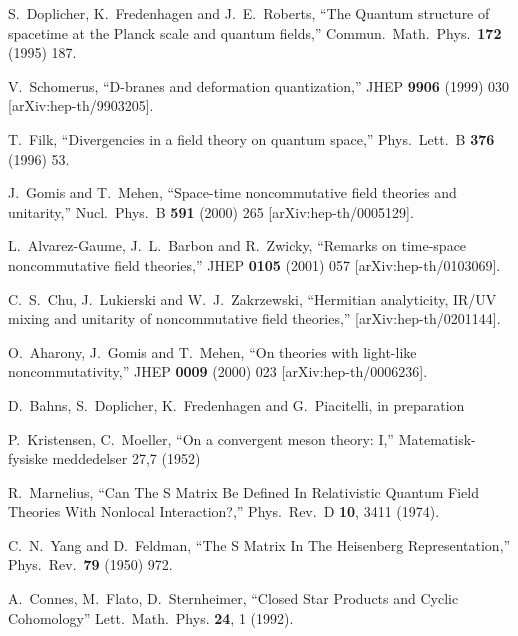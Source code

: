\documentclass[a4paper,twoside,12pt]{article}
\begin{document}
\begin{thebibliography}{99}

S.~Doplicher, K.~Fredenhagen and J.~E.~Roberts,
``The Quantum structure of spacetime at the Planck scale and quantum 
fields,''
Commun.\ Math.\ Phys.\  {\bf 172} (1995) 187.

V.~Schomerus,
``D-branes and deformation quantization,''
JHEP {\bf 9906} (1999) 030
[arXiv:hep-th/9903205].


T.~Filk,
``Divergencies in a field theory on quantum space,''
Phys.\ Lett.\ B {\bf 376} (1996) 53.


J.~Gomis and T.~Mehen,
``Space-time noncommutative field theories and unitarity,''
Nucl.\ Phys.\ B {\bf 591} (2000) 265
[arXiv:hep-th/0005129].


L.~Alvarez-Gaume, J.~L.~Barbon and R.~Zwicky,
``Remarks on time-space noncommutative field theories,''
JHEP {\bf 0105} (2001) 057
[arXiv:hep-th/0103069].

C.~S.~Chu, J.~Lukierski and W.~J.~Zakrzewski,
``Hermitian analyticity, IR/UV mixing and unitarity of noncommutative  field
theories,'' [arXiv:hep-th/0201144].

O.~Aharony, J.~Gomis and T.~Mehen,
``On theories with light-like noncommutativity,''
JHEP {\bf 0009} (2000) 023
[arXiv:hep-th/0006236].


D.~Bahns, S.~Doplicher, K.~Fredenhagen and G.~Piacitelli,
in preparation


P.~Kristensen, C.~Moeller,
``On a convergent meson theory: I,''
Matematisk-fysiske meddedelser 27,7 (1952)  


R.~Marnelius,
``Can The S Matrix Be Defined In Relativistic Quantum Field Theories With
Nonlocal Interaction?,'' 
Phys.\ Rev.\ D {\bf 10}, 3411 (1974).


C.~N.~Yang and D.~Feldman,
``The S Matrix In The Heisenberg Representation,''
Phys.\ Rev.\  {\bf 79} (1950) 972.


A.~Connes, M.~Flato, D.~Sternheimer,
``Closed Star Products and Cyclic Cohomology''
Lett.\ Math.\ Phys. {\bf 24}, 1 (1992).


\end{thebibliography}
\end{document}

